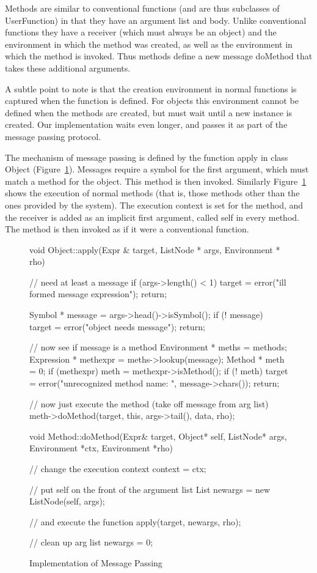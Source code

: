 Methods are similar to conventional functions (and are thus subclasses of
{\sf UserFunction}) in that they have an argument list and body.  Unlike
conventional functions they have a receiver (which must always be an object)
and the environment in which the method was created, as well as the
environment in which the method is invoked.  Thus methods define a new
message {\sf doMethod} that takes these additional arguments.

A subtle point to note is that the creation environment in normal functions
is captured when the function is defined.  For objects this environment
cannot be defined when the methods are created, but must wait until a new
instance is created.  Our implementation waits even longer, and passes it 
as part of the message passing protocol.

The mechanism of message passing is defined by the function {\sf apply} in
class {\sf Object} (Figure~\ref{apply}).  Messages require a symbol for the
first argument, which must match a method for the object.  This method is
then invoked.  Similarly Figure~\ref{apply} shows the execution of normal
methods (that is, those methods other than the ones provided by the
system).  The execution context is set for
the method, and the receiver is added as an implicit first argument, 
called {\sf self} in every method.  The method is then invoked as if it
were a conventional function.

\begin{figure}
\begin{cprog}
void Object::apply(Expr & target, ListNode * args, Environment * rho)
{
	// need at least a message
	if (args->length() < 1) {
		target = error("ill formed message expression");
		return;
		}

	Symbol * message = args->head()->isSymbol();
	if (! message) {
		target = error("object needs message");
		return;
		}

	// now see if message is a method
	Environment * meths = methods;
	Expression * methexpr = meths->lookup(message);
	Method * meth = 0;
	if (methexpr) meth = methexpr->isMethod();
	if (! meth) {
		target = error("unrecognized method name: ", message->chars());
		return;
		}

	// now just execute the method (take off message from arg list)
	meth->doMethod(target, this, args->tail(), data, rho);
}

void Method::doMethod(Expr& target, Object* self, ListNode* args, 
	Environment *ctx, Environment *rho)
{
	// change the execution context
	context = ctx;

	// put self on the front of the argument list
	List newargs = new ListNode(self, args);

	// and execute the function
	apply(target, newargs, rho);

	// clean up arg list
	newargs = 0;
}
\end{cprog}
\caption{Implementation of Message Passing}\label{apply}
\end{figure}

